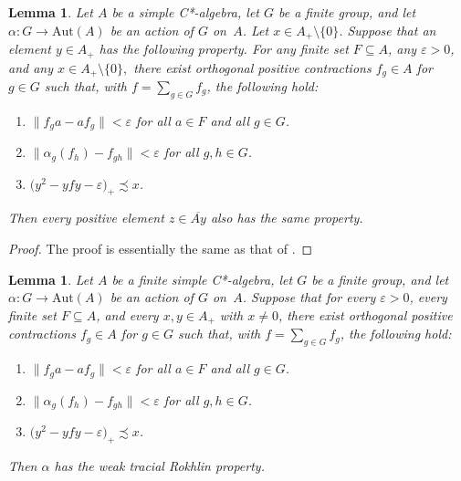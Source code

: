\documentclass[11pt]{amsart}
\theoremstyle{plain}
\newtheorem{lemma}[theorem]{Lemma}
\theoremstyle{definition}
\theoremstyle{remark}
\numberwithin{equation}{section}
\begin{document}
\begin{lemma}\label{L_8809_UseAppId}
Let $A$ be a simple C*-algebra, let $G$ be a finite group,
and let $\alpha \colon G \to \mathrm{Aut} (A)$
be an action of $G$ on~$A$.
Let $x \in A_{+} \setminus \{ 0 \}$.
Suppose that an element $y \in A_{+}$ has the following property.
For any finite set $F \subseteq A$,
any $\varepsilon > 0$,
and any $x \in A_{+} \setminus \{ 0 \},$
there exist orthogonal positive contractions
$f_g \in A$ for $g \in G$ such that,
with $f = \sum_{g \in G} f_{g}$,
the following hold:
%
\begin{enumerate}%
%
\item\label{L_8809_UseAppId_WTRP-COM}
$\| f_{g} a - a f_{g} \| < \varepsilon$
for all $a \in F$ and all $g \in G$.
\item\label{L_8809_UseAppId_WTRP-LTR}
$\|\alpha_{g} (f_{h}) - f_{g h} \| < \varepsilon$ for all $g, h \in G$.
\item\label{L_8809_UseAppId_WTRP-CU-EQ}
$\bigl( y^{2} - y f y - \varepsilon \bigr)_{+} \precsim x$.
\end{enumerate}
%
Then every positive element $z \in \overline{A y}$
also has the same property.
\end{lemma}

\begin{proof}
The proof is essentially the same as that of \cite[Lemma~3.5]{AGJP21}.
\end{proof}


\begin{lemma}\label{L_8814_TRP_Fin}
Let $A$ be a finite simple C*-algebra, let $G$ be a finite group,
and let $\alpha \colon G \to \mathrm{Aut} (A)$
be an action of $G$ on~$A$.
Suppose that for every $\varepsilon > 0$,
every finite set $F \subseteq A$,
and every $x, y \in A_{+}$ with $x \neq 0$,
there exist orthogonal positive contractions
$f_g \in A$ for $g \in G$ such that,
with $f = \sum_{g \in G} f_{g}$,
the following hold:
%
\begin{enumerate}
\item\label{L_8814_TRP_Fin_WTRP_COM}
$\| f_{g} a - a f_{g} \| < \varepsilon$
for all $a \in F$ and all $g \in G$.
\item\label{L_8814_TRP_FinWTRP_LTR}
$\|\alpha_{g} (f_{h}) - f_{g h} \| < \varepsilon$ for all $g, h \in G$.
\item\label{L_8814_TRP_FinWTRP_CU_EQ}
$\bigl( y^{2} - y f y - \varepsilon \bigr)_{+} \precsim x$.
\end{enumerate}
%
Then $\alpha$ has the weak tracial Rokhlin property.
\end{lemma}
\end{document}

